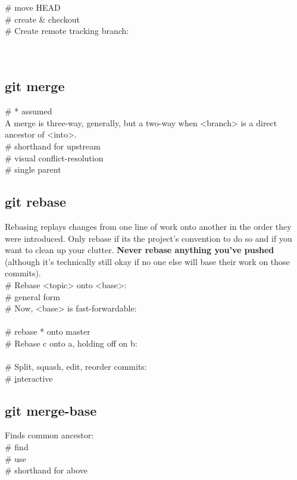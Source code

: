  \# move HEAD \\
 \# create \& checkout \\
\# Create remote tracking branch:\\
 \\
 \\



\subsection*{git merge}
 \# * assumed \\
A merge is three-way, generally, but a two-way  when <branch> is a direct ancestor of <into>.\\ 
 \# shorthand for upstream \\
 \# visual conflict-resolution \\
 \# single parent \\ 



\subsection*{git rebase}
{\footnotesize 
Rebasing replays changes from one line of work onto another in the order they were introduced.  
Only rebase if it\textquotesingle s the project's convention to do so and if you want to clean up your clutter. \textbf{Never rebase anything you've pushed} (although it's technically still okay if no one else will base their work on those commits).}\\
\# Rebase <topic> onto <base>:\\ 
 \# general form \\
\# Now, <base> is fast-forwardable:\\
\\
 \# rebase * onto master\\
\# Rebase c onto a, holding off on b: \\
 \\
\# Split, squash, edit, reorder commits: \\
 \# \underline{i}nteractive \\


\subsection*{git merge-base}
Finds common ancestor:\\
 \# find \\
 \# use \\
 \# shorthand for above \\

